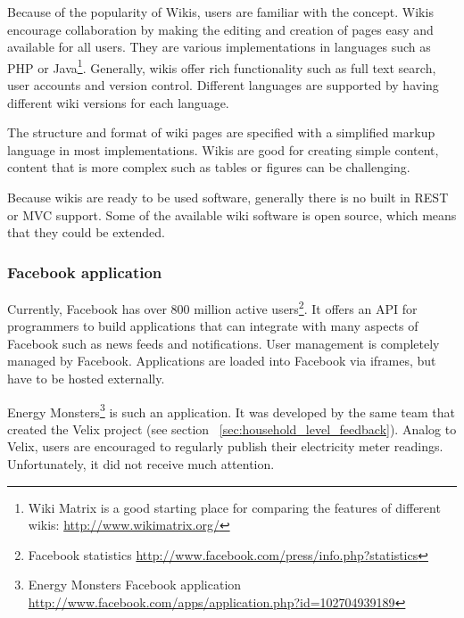 Because of the popularity of Wikis, users are familiar with the concept. Wikis encourage collaboration by making the editing and creation of pages easy and available for all users. They are various implementations in languages such as PHP or Java\footnote{Wiki Matrix is a good starting place for comparing the features of different wikis: \url{http://www.wikimatrix.org/}}. Generally, wikis offer rich functionality such as full text search, user accounts and version control. Different languages are supported by having different wiki versions for each language.  

The structure and format of wiki pages are specified with a simplified markup language in most implementations. Wikis are good for creating simple content, content that is more complex such as tables or figures can be challenging\cite{wikis_collaboration}.

Because wikis are ready to be used software, generally there is no built in REST or MVC support. Some of the available wiki software is open source, which means that they could be extended. 

\subsubsection{Facebook application}
Currently, Facebook has over 800 million active users\footnote{Facebook statistics \url{http://www.facebook.com/press/info.php?statistics}}. It offers an API for programmers to build applications that can integrate with many aspects of Facebook such as news feeds and notifications. User management is completely managed by Facebook. Applications are loaded into Facebook via iframes, but have to be hosted externally.

Energy Monsters\footnote{Energy Monsters Facebook application \url{http://www.facebook.com/apps/application.php?id=102704939189}} is such an application. It was developed by the same team that created the Velix project (see section ~\ref{sec:household_level_feedback}). Analog to Velix, users are encouraged to regularly publish their electricity meter readings. %
Unfortunately, it did not receive much attention. 	

